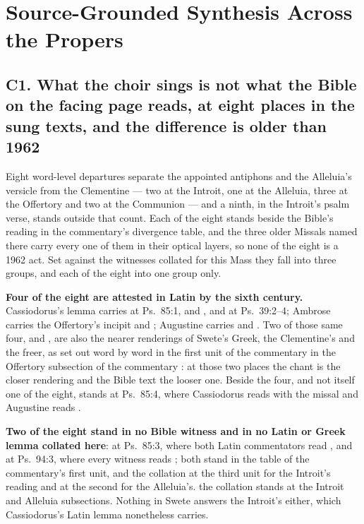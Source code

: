 \sectionguard
\section*{Source-Grounded Synthesis Across the Propers}

\subsection*{C1. What the choir sings is not what the Bible on the facing page reads, at eight places in the sung texts, and the difference is older than 1962}

Eight word-level departures separate the appointed antiphons and the Alleluia's
versicle from the Clementine --- two at the Introit, one at the Alleluia, three
at the Offertory and two at the Communion --- and a ninth, in the Introit's psalm
verse, stands outside that count. Each of the eight stands beside the Bible's
reading in the commentary's divergence table, and the three older Missals named
there carry every one of them in their optical layers, so none
of the eight is a 1962 act. Set against the witnesses collated for this Mass they
fall into three groups, and each of the eight into one group only.

\textbf{Four of the eight are attested in Latin by the sixth century.}
Cassiodorus's lemma carries  at Ps.\ 85:1, and ,
 and  at Ps.\ 39:2--4; Ambrose carries the
Offertory's incipit and ; Augustine carries  and . Two of those same four,  and
, are also the nearer renderings of Swete's Greek, the Clementine's
 and  the freer, as set out word by word
\ifdefined\TriptychSynthesisEdition
in the first unit of the commentary%
\else
in the Offertory subsection of the commentary%
\fi{}: at those two places the chant is the closer
rendering and the Bible text the looser one. Beside the four, and not itself one
of the eight, stands  at Ps.\ 85:4, where Cassiodorus reads with
the missal and Augustine reads .

\textbf{Two of the eight stand in no Bible witness and in no Latin or Greek
lemma collated here}:  at Ps.\ 85:3, where both Latin
commentators read , and  at Ps.\ 94:3, where
every witness reads ;
\ifdefined\TriptychSynthesisEdition
both stand in the table of the commentary's first unit, and the collation at the
third unit for the Introit's reading and at the second for the Alleluia's.%
\else
the collation stands at the Introit and Alleluia
subsections.%
\fi{} Nothing in Swete answers the Introit's
 either, which Cassiodorus's Latin lemma nonetheless carries.


